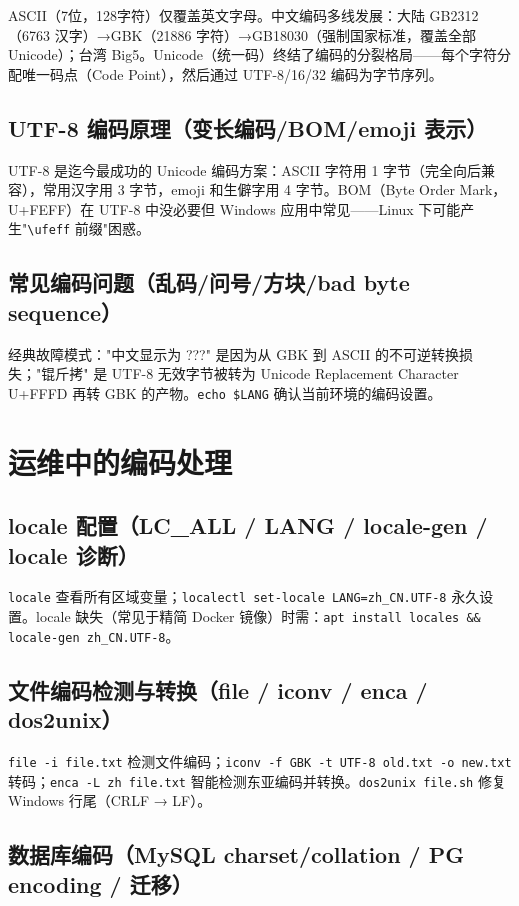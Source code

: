 \documentclass[12pt,UTF8]{ctexbook}
\begin{document}
ASCII（7位，128字符）仅覆盖英文字母。中文编码多线发展：大陆 GB2312（6763 汉字）→GBK（21886 字符）→GB18030（强制国家标准，覆盖全部 Unicode）；台湾 Big5。Unicode（统一码）终结了编码的分裂格局——每个字符分配唯一码点（Code Point），然后通过 UTF-8/16/32 编码为字节序列。

    \subsection{UTF-8 编码原理（变长编码/BOM/emoji 表示）}

UTF-8 是迄今最成功的 Unicode 编码方案：ASCII 字符用 1 字节（完全向后兼容），常用汉字用 3 字节，emoji 和生僻字用 4 字节。BOM（Byte Order Mark，U+FEFF）在 UTF-8 中没必要但 Windows 应用中常见——Linux 下可能产生"\verb|\ufeff| 前缀"困惑。

    \subsection{常见编码问题（乱码/问号/方块/bad byte sequence）}

经典故障模式："中文显示为 ???" 是因为从 GBK 到 ASCII 的不可逆转换损失；"锟斤拷" 是 UTF-8 无效字节被转为 Unicode Replacement Character U+FFFD 再转 GBK 的产物。\verb|echo $LANG| 确认当前环境的编码设置。

  \section{运维中的编码处理}
    \subsection{locale 配置（LC\_ALL / LANG / locale-gen / locale 诊断）}

\verb|locale| 查看所有区域变量；\verb|localectl set-locale LANG=zh_CN.UTF-8| 永久设置。locale 缺失（常见于精简 Docker 镜像）时需：\verb|apt install locales && locale-gen zh_CN.UTF-8|。

    \subsection{文件编码检测与转换（file / iconv / enca / dos2unix）}

\verb|file -i file.txt| 检测文件编码；\verb|iconv -f GBK -t UTF-8 old.txt -o new.txt| 转码；\verb|enca -L zh file.txt| 智能检测东亚编码并转换。\verb|dos2unix file.sh| 修复 Windows 行尾（CRLF → LF）。

    \subsection{数据库编码（MySQL charset/collation / PG encoding / 迁移）}
\end{document}

